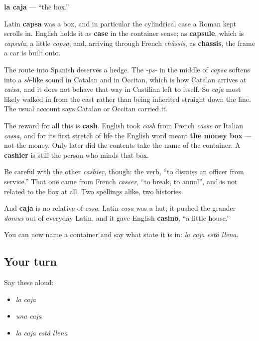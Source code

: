 \begin{cousinweb}
\textbf{la caja} — \textquotedblleft{}the box.\textquotedblright{}

Latin \textbf{capsa} was a box, and in particular the cylindrical case a Roman kept scrolls in. English holds it as \textbf{case} in the container sense; as \textbf{capsule}, which is \emph{capsula}, a little \emph{capsa}; and, arriving through French \emph{châssis}, as \textbf{chassis}, the frame a car is built onto.

The route into Spanish deserves a hedge. The \emph{-ps-} in the middle of \emph{capsa} softens into a \emph{sh}-like sound in Catalan and in Occitan, which is how Catalan arrives at \emph{caixa}, and it does not behave that way in Castilian left to itself. So \emph{caja} most likely walked in from the east rather than being inherited straight down the line. The usual account says Catalan or Occitan carried it.

The reward for all this is \textbf{cash}. English took \emph{cash} from French \emph{casse} or Italian \emph{cassa}, and for its first stretch of life the English word meant \textbf{the money box} — not the money. Only later did the contents take the name of the container. A \textbf{cashier} is still the person who minds that box.

Be careful with the other \emph{cashier}, though: the verb, \textquotedblleft{}to dismiss an officer from service.\textquotedblright{} That one came from French \emph{casser}, \textquotedblleft{}to break, to annul\textquotedblright{}, and is not related to the box at all. Two spellings alike, two histories.

And \textbf{caja} is no relative of \emph{casa}. Latin \emph{casa} was a hut; it pushed the grander \emph{domus} out of everyday Latin, and it gave English \textbf{casino}, \textquotedblleft{}a little house.\textquotedblright{}
\end{cousinweb}

\begin{grammarlens}[title={What you've built}]
You can now name a container and say what state it is in: \emph{la caja está llena}.
\end{grammarlens}

\subsection*{Your turn}
Say these aloud:

\begin{itemize}
\raggedright
  \item \emph{la caja}
  \item \emph{una caja}
  \item \emph{la caja está llena}
\end{itemize}

